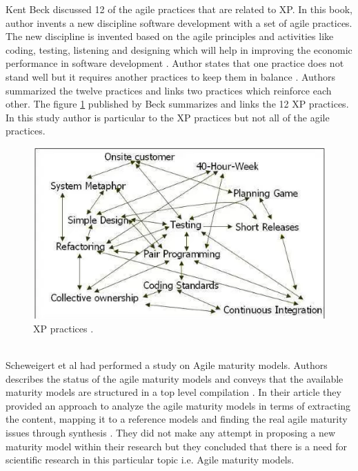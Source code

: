 \documentclass[a4paper,oneside]{bth}
\begin{document}
Kent Beck \cite{beck_extreme_2000} discussed 12 of the agile practices that are related to XP. In this book, author invents a new discipline software development with a set of agile practices. The new discipline is invented based on the agile principles and activities like coding, testing, listening and designing which will help in improving the economic performance in software development \cite{beck_extreme_2000}. Author states that one practice does not stand well but it requires another practices to keep them in balance \cite{beck_extreme_2000}. Authors summarized the twelve practices and links two practices which reinforce each other. The figure \ref{XP} published by Beck summarizes and links the 12 XP practices. In this study author is particular to the XP practices but not all of the agile practices.
\begin{figure}[h]
\centering
\includegraphics{beck.png}
\caption{XP practices \cite{beck_extreme_2000}. \label{XP}}
\end{figure}\\

Scheweigert et al had performed a study on Agile maturity models. Authors describes the status of the agile maturity models and conveys that the available maturity models are structured in a top level compilation \cite{schweigert_agile_2013}. In their article they provided an approach to analyze the agile maturity models in terms of extracting the content, mapping it to a reference models and finding the real agile maturity issues through synthesis \cite{schweigert_agile_2013}. They did not make any attempt in proposing a new maturity model within their research but they concluded that there is a need for scientific research in this particular topic i.e. Agile maturity models.
\end{document}
